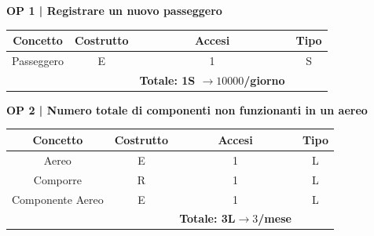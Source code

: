 \textbf{\small OP 1 | Registrare un nuovo passeggero}\\

\begin{tabular}{ c c c c}
	\hline
	\textbf{Concetto} & \textbf{Costrutto} & \textbf{Accesi} & \textbf{Tipo}\\
	\hline
	\textsf{\small Passeggero} & \textsf{\small E} & \textsf{\small 1} &  \textsf{\small S}\\
	\hline
	\textsf{\small } & \textsf{\small } & \textbf{Totale: 1S $\rightarrow 10000$/giorno} \textsf{\small } & \textsf{\small }\\ %
	\hline
\end{tabular} %

\vspace{.6cm}


\textbf{\small OP 2 | Numero totale di componenti non funzionanti in un aereo}\\

\begin{tabular}{ c c c c} %
	\hline
	\textbf{Concetto} & \textbf{Costrutto} & \textbf{Accesi} & \textbf{Tipo}\\
	\hline
	\textsf{\small Aereo} & \textsf{\small E} & \textsf{\small 1} &  \textsf{\small L}\\
	\hline
	\textsf{\small Comporre} & \textsf{\small R} & \textsf{\small 1} &  \textsf{\small L}\\
	\hline
	\textsf{\small Componente Aereo} & \textsf{\small E} & \textsf{\small 1} &  \textsf{\small L}\\
	\hline
	\textsf{\small } & \textsf{\small } & \textbf{Totale: 3L$\rightarrow 3$/mese} \textsf{\small } & \textsf{\small }\\ 
	\hline
\end{tabular}

